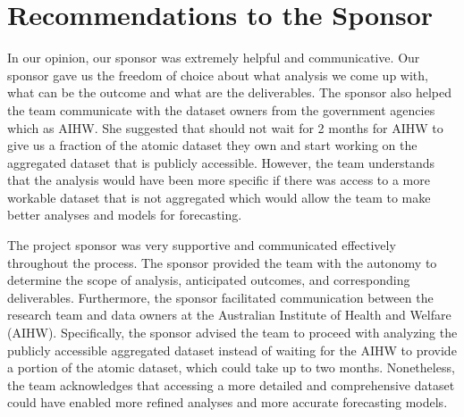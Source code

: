 \section{Recommendations to the Sponsor}
In our opinion, our sponsor was extremely helpful and communicative. Our sponsor gave us the freedom of choice about what analysis we come up with, what can be the outcome and what are the deliverables. The sponsor also helped the team communicate with the dataset owners from the government agencies which as AIHW. She suggested that should not wait for 2 months for AIHW to give us a fraction of the atomic dataset they own and start working on the aggregated dataset that is publicly accessible. However, the team understands that the analysis would have been more specific if there was access to a more workable dataset that is not aggregated which would allow the team to make better analyses and models for forecasting.

The project sponsor was very supportive and communicated effectively throughout the process. The sponsor provided the team with the autonomy to determine the scope of analysis, anticipated outcomes, and corresponding deliverables. Furthermore, the sponsor facilitated communication between the research team and data owners at the Australian Institute of Health and Welfare (AIHW). Specifically, the sponsor advised the team to proceed with analyzing the publicly accessible aggregated dataset instead of waiting for the AIHW to provide a portion of the atomic dataset, which could take up to two months. Nonetheless, the team acknowledges that accessing a more detailed and comprehensive dataset could have enabled more refined analyses and more accurate forecasting models.